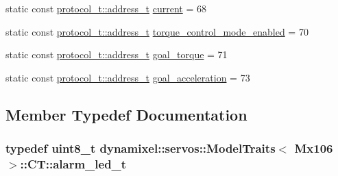\begin{DoxyCompactItemize}
\item 
static const \hyperlink{classdynamixel_1_1protocols_1_1_protocol1_a4383ba392b57ea00dd0273c6da5e8a65}{protocol\+\_\+t\+::address\+\_\+t} \hyperlink{structdynamixel_1_1servos_1_1_model_traits_3_01_mx106_01_4_1_1_c_t_a76023cc6cc7e671d58cae11f74ea1830}{current} = 68
\item 
static const \hyperlink{classdynamixel_1_1protocols_1_1_protocol1_a4383ba392b57ea00dd0273c6da5e8a65}{protocol\+\_\+t\+::address\+\_\+t} \hyperlink{structdynamixel_1_1servos_1_1_model_traits_3_01_mx106_01_4_1_1_c_t_a15618c19842b4c285b5ca23348ba0fb2}{torque\+\_\+control\+\_\+mode\+\_\+enabled} = 70
\item 
static const \hyperlink{classdynamixel_1_1protocols_1_1_protocol1_a4383ba392b57ea00dd0273c6da5e8a65}{protocol\+\_\+t\+::address\+\_\+t} \hyperlink{structdynamixel_1_1servos_1_1_model_traits_3_01_mx106_01_4_1_1_c_t_aa3b23e6a3a914c1241c5374bcb987e1b}{goal\+\_\+torque} = 71
\item 
static const \hyperlink{classdynamixel_1_1protocols_1_1_protocol1_a4383ba392b57ea00dd0273c6da5e8a65}{protocol\+\_\+t\+::address\+\_\+t} \hyperlink{structdynamixel_1_1servos_1_1_model_traits_3_01_mx106_01_4_1_1_c_t_ad2a009182a438a4f90b5d9c370d33ad1}{goal\+\_\+acceleration} = 73
\end{DoxyCompactItemize}


\subsection{Member Typedef Documentation}
\hypertarget{structdynamixel_1_1servos_1_1_model_traits_3_01_mx106_01_4_1_1_c_t_a798058506f81517dff42eca7d1514529}{}
\subsubsection[{alarm\+\_\+led\+\_\+t}]{\setlength{\rightskip}{0pt plus 5cm}typedef uint8\+\_\+t {\bf dynamixel\+::servos\+::\+Model\+Traits}$<$ {\bf Mx106} $>$\+::{\bf C\+T\+::alarm\+\_\+led\+\_\+t}}\label{structdynamixel_1_1servos_1_1_model_traits_3_01_mx106_01_4_1_1_c_t_a798058506f81517dff42eca7d1514529}
\hypertarget{structdynamixel_1_1servos_1_1_model_traits_3_01_mx106_01_4_1_1_c_t_a89d7375c692dec61552d20736f197ef4}{}
